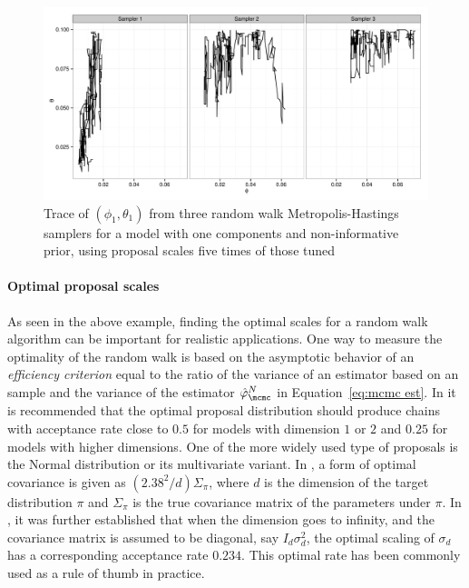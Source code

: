 \begin{figure}
  \includegraphics[width=\linewidth]{fig/PET_MH_H_Path.pdf}
  \caption[Trace of parameters in the random walk algorithm for the
  \protect\pet compartmental model (uncalibrated)]
  {Trace of $(\phi_1,\theta_1)$ from three random walk
    Metropolis-Hastings samplers for a \pet model with one components and
    non-informative prior, using proposal scales five times of those tuned}
  \label{fig:pet mh untuned}
\end{figure}

\paragraph{Optimal proposal scales}

As seen in the above example, finding the optimal scales for a random walk
algorithm can be important for realistic applications. One way to measure the
optimality of the random walk is based on the asymptotic behavior of an
\emph{efficiency criterion} equal to the ratio of the variance of an estimator
based on an \iid sample and the variance of the estimator
$\hat\varphi_{\mcmc}^N$ in Equation~\eqref{eq:mcmc est}. In
\cite{Roberts:1997dg} it is recommended that the optimal proposal distribution
should produce chains with acceptance rate close to $0.5$ for models with
dimension $1$ or $2$ and $0.25$ for models with higher dimensions. One of the
more widely used type of proposals is the Normal distribution or its
multivariate variant. In \cite{Gelman:1995vx}, a form of optimal covariance is
given as $(2.38^2/d)\Sigma_{\pi}$, where $d$ is the dimension of the target
distribution $\pi$ and $\Sigma_{\pi}$ is the true covariance matrix of the
parameters under $\pi$. In \cite{Roberts:2001ta}, it was further established
that when the dimension goes to infinity, and the covariance matrix is assumed
to be diagonal, say $I_d\sigma_d^2$, the optimal scaling of $\sigma_d$ has a
corresponding acceptance rate $0.234$. This optimal rate has been commonly
used as a rule of thumb in practice.


